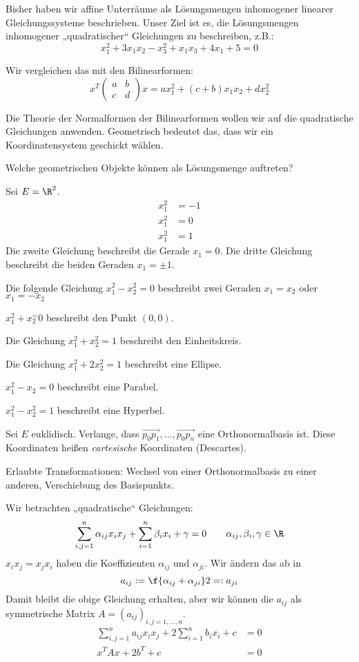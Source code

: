 \documentclass[a4paper, 10pt]{scrbook}
\begin{document}
Bisher haben wir affine Unterräume als Lösungsmengen inhomogener linearer Gleichungssysteme beschrieben.
Unser Ziel ist es, die Lösungsmengen inhomogener „quadratischer“ Gleichungen zu beschreiben, z.B.:
\[
	x_1^2 + 3x_1x_2 - x_3^2 + x_1x_3 + 4x_1 + 5 = 0
\]

Wir vergleichen das mit den Bilinearformen:
\[
	x^T \begin{pmatrix}a&b\\c&d\end{pmatrix}x = ax_1^2 + (c+b)x_1x_2 + dx_2^2
\]

Die Theorie der Normalformen der Bilinearformen wollen wir auf die quadratische Gleichungen anwenden.
Geometrisch bedeutet das, dass wir ein Koordinatensystem geschickt wählen.

Welche geometrischen Objekte können als Lösungsmenge auftreten?

\begin{ex}
	Sei $E=\R^2$.
	\begin{align*}
		x_1^2 &= -1\\
		x_1^2 &= 0\\
		x_1^2 &= 1
	\end{align*}
	Die zweite Gleichung beschreibt die Gerade $x_1=0$.
	Die dritte Gleichung beschreibt die beiden Geraden $x_1=\pm 1$.
	
	Die folgende Gleichung $x_1^2 - x_2^2 = 0$ beschreibt zwei Geraden $x_1=x_2$ oder $x_1 = -x_2$

	$x_1^2+x_2^=0$ beschreibt den Punkt $(0,0)$.
	
	Die Gleichung
	$
		x_1^2 + x_2^2 = 1
	$
	beschreibt den Einheitskreis.

	Die Gleichung
	$
		x_1^2 + 2x_2^2 = 1
	$
	beschreibt eine Ellipse.
	
	$x_1^2 - x_2 = 0$ beschreibt eine Parabel.

	$x_1^2 - x_2^2 = 1$ beschreibt eine Hyperbel.
\end{ex}

Sei $E$ euklidisch.
Verlange, dass $\vec{p_0p_1}, \dotsc, \vec{p_0p_n}$ eine Orthonormalbasis ist.
Diese Koordinaten heißen \emph{cartesische} Koordinaten (Descartes).

Erlaubte Transformationen: Wechsel von einer Orthonormalbasis zu einer anderen, Verschiebung des Basispunkts.

Wir betrachten „quadratische“ Gleichungen:
\[
	\sum_{i,j=1}^n \alpha_{ij}x_ix_j + \sum_{i=1}^n \beta_ix_i + \gamma = 0 \qquad \alpha_{ij},\beta_i, \gamma \in \R
\]
$x_ix_j = x_jx_i$ haben die Koeffizienten $\alpha_{ij}$ und $\alpha_{ji}$.
Wir ändern das ab in
\[
	a_{ij} := \f{\alpha_{ij} + \alpha_{ji}}2 =: a_{ji}
\]
Damit bleibt die obige Gleichung erhalten, aber wir können die $a_{ij}$ als symmetrische Matrix $A=(a_{ij})_{i,j=1,\dotsc,n}$.
\begin{align*}
	\sum_{i,j=1}^n a_{ij}x_ix_j + 2 \sum_{i=1}^n b_i x_i + c &= 0\\
	x^TAx + 2b^T + c &= 0
\end{align*}
\end{document}
